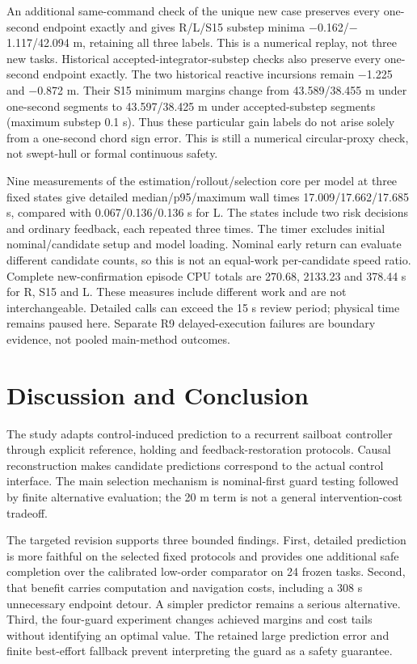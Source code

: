 \documentclass[conference]{IEEEtran}
\begin{document}
An additional same-command check of the unique new case preserves every one-second endpoint exactly and gives R/L/S15 substep minima \ensuremath{-}0.162/\ensuremath{-}1.117/42.094 m, retaining all three labels. This is a numerical replay, not three new tasks. Historical accepted-integrator-substep checks also preserve every one-second endpoint exactly. The two historical reactive incursions remain \ensuremath{-}1.225 and \ensuremath{-}0.872 m. Their S15 minimum margins change from 43.589/38.455 m under one-second segments to 43.597/38.425 m under accepted-substep segments (maximum substep 0.1 s). Thus these particular gain labels do not arise solely from a one-second chord sign error. This is still a numerical circular-proxy check, not swept-hull or formal continuous safety.

Nine measurements of the estimation/rollout/selection core per model at three fixed states give detailed median/p95/maximum wall times 17.009/17.662/17.685 s, compared with 0.067/0.136/0.136 s for L. The states include two risk decisions and ordinary feedback, each repeated three times. The timer excludes initial nominal/candidate setup and model loading. Nominal early return can evaluate different candidate counts, so this is not an equal-work per-candidate speed ratio. Complete new-confirmation episode CPU totals are 270.68, 2133.23 and 378.44 s for R, S15 and L. These measures include different work and are not interchangeable. Detailed calls can exceed the 15 s review period; physical time remains paused here. Separate R9 delayed-execution failures are boundary evidence, not pooled main-method outcomes.

\section{Discussion and Conclusion}

The study adapts control-induced prediction to a recurrent sailboat controller through explicit reference, holding and feedback-restoration protocols. Causal reconstruction makes candidate predictions correspond to the actual control interface. The main selection mechanism is nominal-first guard testing followed by finite alternative evaluation; the 20 m term is not a general intervention-cost tradeoff.

The targeted revision supports three bounded findings. First, detailed prediction is more faithful on the selected fixed protocols and provides one additional safe completion over the calibrated low-order comparator on 24 frozen tasks. Second, that benefit carries computation and navigation costs, including a 308 s unnecessary endpoint detour. A simpler predictor remains a serious alternative. Third, the four-guard experiment changes achieved margins and cost tails without identifying an optimal value. The retained large prediction error and finite best-effort fallback prevent interpreting the guard as a safety guarantee.
\end{document}
